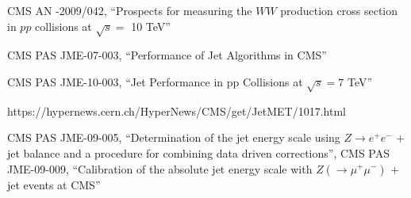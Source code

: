 \begin{thebibliography}{99}

CMS AN -2009/042, ``Prospects for measuring the $WW$ production 
cross section in $pp$ collisions at $\sqrt{s}=$ 10 TeV''

CMS PAS JME-07-003, ``Performance of Jet Algorithms in CMS''

CMS PAS JME-10-003, ``Jet Performance in pp Collisions at $\sqrt{s}=7$ TeV''

https://hypernews.cern.ch/HyperNews/CMS/get/JetMET/1017.html

CMS PAS JME-09-005, ``Determination of the jet energy scale using 
$Z\to e^+e^-$ + jet \pt balance and a procedure for combining data driven 
corrections'', 
CMS PAS JME-09-009, ``Calibration of the absolute jet energy scale with 
$Z(\to\mu^+\mu^-)$ + jet events at CMS''


\end{thebibliography}
